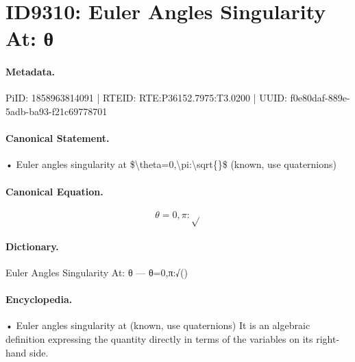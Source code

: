 \section*{ID9310: Euler Angles Singularity At: θ}
\paragraph{Metadata.}
PiID: 1858963814091 | RTEID: RTE:P36152.7975:T3.0200 | UUID: f0e80daf-889e-5adb-ba93-f21c69778701

\paragraph{Canonical Statement.}
• Euler angles singularity at \$\textbackslash{}theta=0,\textbackslash{}pi:\textbackslash{}sqrt\{\}\$ (known, use quaternions)

\paragraph{Canonical Equation.}
\[
\theta=0,\pi:\sqrt{}
\]

\paragraph{Dictionary.}
Euler Angles Singularity At: θ — θ=0,π:√()

\paragraph{Encyclopedia.}
• Euler angles singularity at (known, use quaternions) It is an algebraic definition expressing the quantity directly in terms of the variables on its right-hand side.
